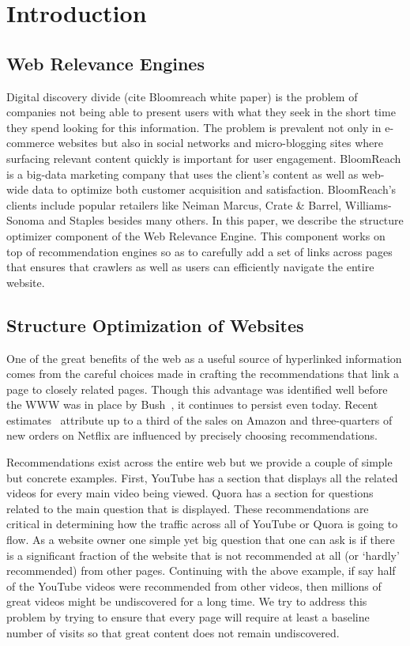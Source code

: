 \section{Introduction}

\subsection{Web Relevance Engines}
Digital discovery divide (cite Bloomreach white paper) is the problem of companies not being able to present users with what they seek in the short time they spend looking for this information.
The problem is prevalent not only in e-commerce websites but also in social networks and micro-blogging sites where surfacing relevant content quickly is important for user engagement.
BloomReach is a big-data marketing company that uses the client's content as well as web-wide data to optimize both customer acquisition and satisfaction.
BloomReach's clients include popular retailers like Neiman Marcus, Crate \& Barrel, Williams-Sonoma and Staples besides many others. In this paper, we describe the structure optimizer component of the Web Relevance Engine.
This component works on top of recommendation engines so as to carefully add a set of links across pages that ensures that crawlers as well as users can efficiently navigate the entire website. 

\subsection{Structure Optimization of Websites}

One of the great benefits of the web as a useful source of hyperlinked
information comes from the careful choices made in crafting the
recommendations that link a page to closely related pages. Though this
advantage was identified well before the WWW was in place by
Bush~\cite{Bush45aswe}, it continues to persist even today.
Recent estimates~\cite{big-data-book13} attribute up to a third of the sales
on Amazon and three-quarters of new orders on Netflix are influenced by precisely choosing recommendations.

Recommendations exist across the entire web but we provide a couple of simple but concrete examples. First, YouTube has a section that displays all the related videos for every main video being viewed. 
Quora has a section for questions related to the main question that is displayed. These recommendations are critical in determining how the traffic across all of YouTube or Quora is going to flow.
As a website owner one simple yet big question that one can ask is if there is a significant fraction of the website that is not recommended at all (or `hardly' recommended) from other pages. Continuing
with the above example, if say half of the YouTube videos were recommended from other videos, then millions of great videos might be undiscovered for a long time. We try to address this
problem by trying to ensure that every page will require at least a baseline number of visits so that great content does not remain undiscovered. 

